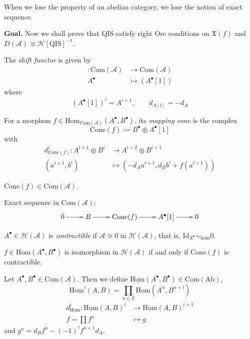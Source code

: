 When we lose the property of an abelian category, we lose the notion of exact
sequence.

{\bf Goal.} Now we shall prove that QIS satisfy right Ore conditions on
$\mathfrak{X}(f)$ and $D(\mathcal{A})\cong \mathcal{H}[\text{QIS}]^{-1}$.

\begin{definition}
\label{definition-shift-functor}
The {\it shift functor} is given by
\begin{align*}
[1]: \text{Com}(\mathcal{A}) &\longrightarrow \text{Com}(\mathcal{A}) \\
A^\bullet &\longmapsto (A^\bullet[1])
\end{align*}
where
$$
(A^\bullet[1])^i=A^{i+1},\qquad  d_{A[1]}=-d_A
$$
\end{definition}

\begin{definition}
\label{definition-mapping-cone}
For a morphsm $f \in
\text{Hom}_{\text{Com}(\mathcal{A})}(A^\bullet,B^{\bullet})$, its {\it mapping
cone} is the complex
$$
\text{Cone}(f):=B^{\bullet}\oplus A^{\bullet}[1]
$$
with
\begin{align*}
d_{\text{Cone}(f)}^i: A^{i+1}\oplus B^{i} &\longrightarrow A^{i+2}\oplus B^{i+1} \\
(a^{i+1},b^i) &\longmapsto (-d_Aa^{i+1},d_Bb^i+f(a^{i+1}))
\end{align*}
\end{definition}

\begin{exercise}
\label{exercise-cone-is-complex}
$\text{Cone}(f) \in \text{Com}(\mathcal{A})$.
\end{exercise}

Exact sequence in $\text{Com}(\mathcal{A})$:
$$
\xymatrix{
0\ar[r]&B\ar[r]&\text{Cone}(f)\ar[r]&A^{\bullet}[1]\ar[r]&0
}
$$
\begin{definition}
\label{definition-contractible-complex}
$A^\bullet \in \mathcal{H}(\mathcal{A})$ is {\it contractible} if $\mathcal{A}
\cong 0$ in $\mathcal{H}(\mathcal{A})$, that is,
$\text{Id}_{A^{\bullet}}\sim_{\text{hom}}0$.
\end{definition}

\begin{exercise}
\label{exercise-isomorphism-iff-cone-contractible}
$f \in \text{Hom}(A^{\bullet},B^{\bullet})$ is isomorphism in
$\mathcal{H}(\mathcal{A})$ if and only if $\text{Cone}(f)$ is contractible.
\end{exercise}

\begin{definition}
\label{definition-Hom-of-complexes}
Let  $A^{\bullet},B^{\bullet}\in \text{Com}(\mathcal{A})$. Then we define
$\underline{\text{Hom}}(A^{\bullet},B^{\bullet}) \in \text{Com}(\text{Ab})$,
$$
\text{Hom}^i(A,B)=\prod_{n \in \mathbb{Z}}\text{Hom}(A^n,B^{n+i})
$$
\begin{align*}
d^i_{\underline{\text{Hom}}}: \underline{\text{Hom}}(A,B)^i &\longrightarrow
\underline{\text{Hom}}(A,B)^{i+1} \\
f=\prod f^n &\longmapsto g
\end{align*}
and $g^n=d_Bf^n-(-1)^i f^{n+1}d_A$.
\end{definition}

